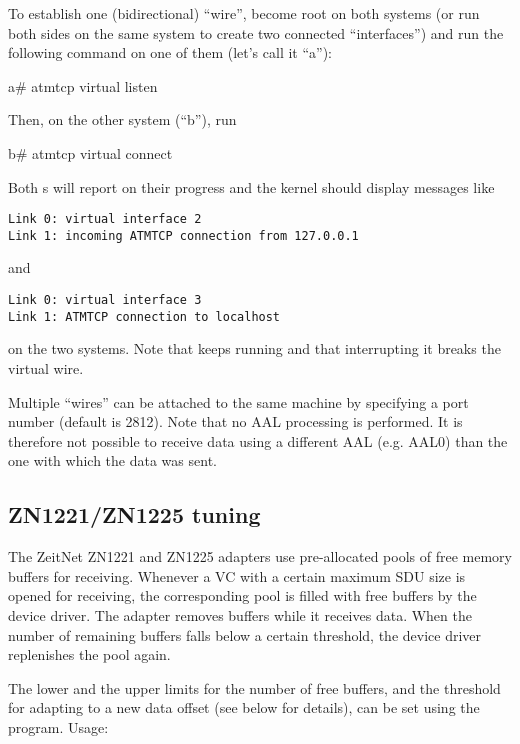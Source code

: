 To establish one (bidirectional) ``wire'', become root on both systems
(or run both sides on the same system to create two connected ``interfaces'')
and run the following command on one of them (let's call it ``a''):

\begin{command}
a\# atmtcp virtual listen
\end{command}

Then, on the other system (``b''), run

\begin{command}
b\# atmtcp virtual connect 
\end{command}

Both s will report on their progress and the kernel should
display messages like

\begin{verbatim}
Link 0: virtual interface 2
Link 1: incoming ATMTCP connection from 127.0.0.1
\end{verbatim}

and

\begin{verbatim}
Link 0: virtual interface 3
Link 1: ATMTCP connection to localhost
\end{verbatim}

on the two systems. Note that  keeps running and that interrupting
it breaks the virtual wire.

Multiple ``wires'' can be attached to the same machine by specifying a
port number (default is 2812). Note that no AAL processing is performed.
It is therefore not possible to receive data using a different AAL (e.g.
AAL0) than the one with which the data was sent.


\subsection{ZN1221/ZN1225 tuning}

The ZeitNet ZN1221 and ZN1225 adapters use pre-allocated pools of free
memory buffers
for receiving. Whenever a VC with a certain maximum SDU size is opened for
receiving, the corresponding pool is filled with free buffers by the device
driver. The adapter removes buffers while it receives data. When the number
of remaining buffers falls below a certain threshold, the device driver
replenishes the pool again.

The lower and the upper limits for the number of free buffers, and the
threshold for adapting to a new data offset (see below for details), can
be set using the  program. Usage:

